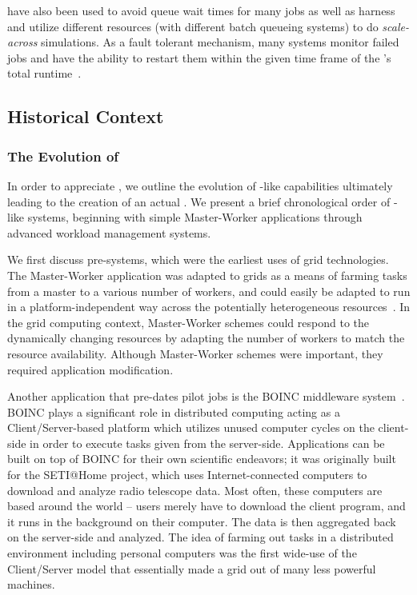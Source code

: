 \documentclass{sig-alternate}
\begin{document}
\pilotjobs have also been used to avoid queue wait times for many jobs
as well as harness and utilize different resources (with different
batch queueing systems) to do \textit{scale-across} simulations.
As a fault tolerant mechanism, many \pilotjob systems monitor
failed jobs and have the ability to restart them within the given 
time frame of the \pilotjob's total runtime~\cite{1742-6596-219-6-062049,condor-g,nilsson2011atlas}. 

\subsection{Historical Context}
\subsubsection*{The Evolution of \pilotjobs}

In order to appreciate \pilotjobs, we outline the evolution of
\pilot-like capabilities ultimately leading to the creation of an actual
\pilotjob. We present a brief chronological order of \pilotjob-like
systems, beginning with simple Master-Worker applications through
advanced workload management systems.

We first discuss pre-\pilotjob systems, which were the earliest uses of grid technologies. The Master-Worker application was adapted to grids as a means of farming tasks from a master to a various number of workers, and could easily be adapted to run in a platform-independent way across the potentially heterogeneous resources~\cite{masterworker, Goux00anenabling}. In the grid computing context, Master-Worker schemes could respond to the dynamically changing resources by adapting the number of workers to match the resource availability. Although Master-Worker schemes were important, they required application modification.

Another application that pre-dates pilot jobs is the BOINC middleware system~\cite{Anderson:2004:BSP:1032646.1033223}. BOINC plays a significant role in distributed computing acting as a Client/Server-based platform which utilizes unused computer cycles on the client-side in order to execute tasks given from the server-side. Applications can be built on top of BOINC for their own scientific endeavors; it was originally built for the SETI@Home project, which uses Internet-connected computers to download and analyze radio telescope data. Most often, these computers are based around the world -- users merely have to download the client program, and it runs in the background on their computer. The data is then aggregated back on the server-side and analyzed. The idea of farming out tasks in a distributed environment including personal computers was the first wide-use of the Client/Server model that essentially made a grid out of many less powerful machines.
\end{document}
